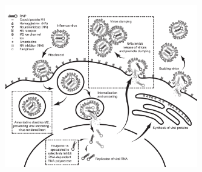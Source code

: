 \begin{figure}
\begin{center}
\includegraphics[width=0.75\textwidth, trim={0cm 0cm 0cm 0cm}, clip]{D_chapters/0_introduction/flu_drug.pdf}
\label{figure:fluDrugs}
\end{center}
\end{figure}
